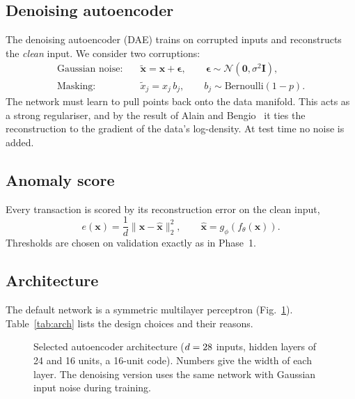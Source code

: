 \documentclass[12pt]{article}
\begin{document}
\subsection{Denoising autoencoder}
The denoising autoencoder (DAE) trains on corrupted inputs and reconstructs the \emph{clean} input. We consider two
corruptions:
\begin{align}
\text{Gaussian noise:}&\quad \tilde{\mathbf{x}}=\mathbf{x}+\bm\epsilon,\qquad \bm\epsilon\sim\mathcal{N}(\mathbf{0},\sigma^2\mathbf{I}),\\
\text{Masking:}&\quad \tilde{x}_j=x_j\, b_j,\qquad b_j\sim\text{Bernoulli}(1-p).
\end{align}
The network must learn to pull points back onto the data manifold. This acts as a strong regulariser, and by the
result of Alain and Bengio~\cite{alain2014} it ties the reconstruction to the gradient of the data's log-density. At
test time no noise is added.

\subsection{Anomaly score}
Every transaction is scored by its reconstruction error on the clean input,
\begin{equation}
e(\mathbf{x})=\frac1d\lVert\mathbf{x}-\hat{\mathbf{x}}\rVert_2^2,\qquad \hat{\mathbf{x}}=g_\phi(f_\theta(\mathbf{x})).
\end{equation}
Thresholds are chosen on validation exactly as in Phase~1.

\subsection{Architecture}
The default network is a symmetric multilayer perceptron (Fig.~\ref{fig:ae}). Table~\ref{tab:arch} lists the design
choices and their reasons.

\begin{figure}[H]
\centering
{}
\caption{Selected autoencoder architecture ($d=28$ inputs, hidden layers of 24 and 16 units, a 16-unit code).
Numbers give the width of each layer. The denoising version uses the same network with Gaussian input noise during
training.}
\label{fig:ae}
\end{figure}
\end{document}
